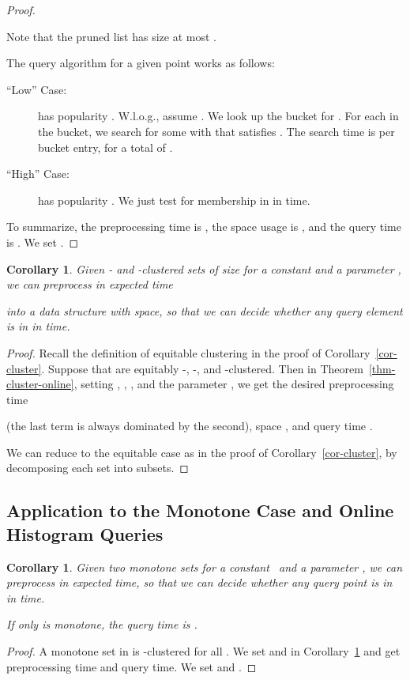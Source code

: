 \documentclass[11pt]{article}
\newtheorem{corollary}[theorem]{Corollary}
\begin{document}
{\begin{proof}
\begin{description}
Note that the pruned list  has size at most
.
\end{description}

The query algorithm for a given point  works as follows:
\begin{description}
\item[``Low'' Case:]  has popularity .
W.l.o.g., assume .
We look up the bucket for .  For each 
in the bucket, we search for some  with 
that satisfies .  The search time is  per bucket entry, for a total of .
\item[``High'' Case:]  has popularity .  We just test  for membership in  in
 time.
\end{description}

To summarize, the preprocessing time is
,
the space usage is ,
and the query time is .
We set .
\end{proof}


\begin{corollary}\label{cor-cluster-online}
Given - and -clustered sets  of size  for a constant  and a parameter ,
we can preprocess in expected time

into a data structure with  space,
so that we can decide whether any query element  is in 
in  time.
\end{corollary}
\begin{proof}
Recall the definition of equitable clustering in the proof of Corollary~\ref{cor-cluster}.
Suppose that 
are equitably  -, -, and -clustered.
Then in Theorem~\ref{thm-cluster-online}, setting ,
, , and the parameter
,
we get the desired preprocessing time

(the last term is always dominated by the second),
space ,
and query time .

We can reduce to the equitable case as in the proof of Corollary~\ref{cor-cluster}, by decomposing each set into
 subsets.
\end{proof}

\subsection{Application to the Monotone Case and
Online Histogram Queries}

\begin{corollary}\label{cor-monotone-online}
Given two monotone sets  for a constant~
and a parameter ,
we can preprocess in  expected time,
so that we can decide whether any query point  is in 
in  time.

If only  is monotone, the query time is
.
\end{corollary}
\begin{proof}
A monotone set in  is -clustered
for all .  We set  and 
in Corollary~\ref{cor-cluster-online}
and get 
preprocessing time and  query time.
We set  and .


\end{proof}}
\end{document}
